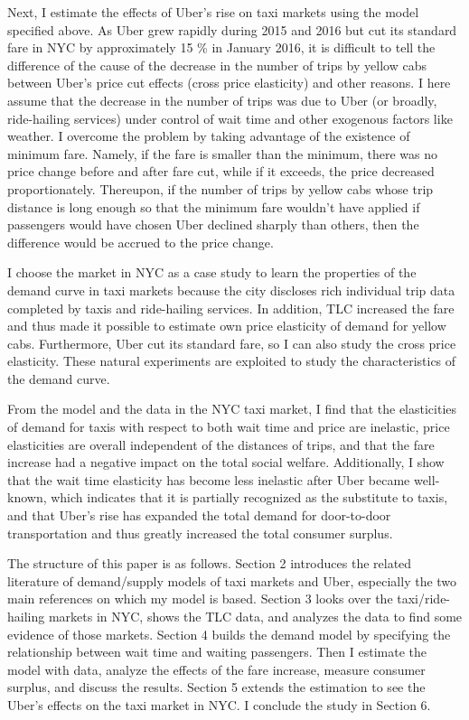 Next, I estimate the effects of Uber's rise on taxi markets using the model specified above. As Uber grew rapidly during 2015 and 2016 but cut its standard fare in NYC by approximately 15 \% in January 2016, it is difficult to tell the difference of the cause of the decrease in the number of trips by yellow cabs between Uber's price cut effects (cross price elasticity) and other reasons. I here assume that the decrease in the number of trips was due to Uber (or broadly, ride-hailing services) under control of wait time and other exogenous factors like weather. I overcome the problem by taking advantage of the existence of minimum fare. Namely, if the fare is smaller than the minimum, there was no price change before and after fare cut, while if it exceeds, the price decreased proportionately. Thereupon, if the number of trips by yellow cabs whose trip distance is long enough so that the minimum fare wouldn't have applied if passengers would have chosen Uber declined sharply than others, then the difference would be accrued to the price change.

I choose the market in NYC as a case study to learn the properties of the demand curve in taxi markets because the city discloses rich individual trip data completed by taxis and ride-hailing services. In addition, TLC increased the fare and thus made it possible to estimate own price elasticity of demand for yellow cabs. Furthermore, Uber cut its standard fare, so I can also study the cross price elasticity. These natural experiments are exploited to study the characteristics of the demand curve.

From the model and the data in the NYC taxi market, I find that the elasticities of demand for taxis with respect to both wait time and price are inelastic, price elasticities are overall independent of the distances of trips, and that the fare increase had a negative impact on the total social welfare. Additionally, I show that the wait time elasticity has become less inelastic after Uber became well-known, which indicates that it is partially recognized as the substitute to taxis, and that Uber's rise has expanded the total demand for door-to-door transportation and thus greatly increased the total consumer surplus.

The structure of this paper is as follows. Section 2 introduces the related literature of demand/supply models of taxi markets and Uber, especially the two main references on which my model is based. Section 3 looks over the taxi/ride-hailing markets in NYC, shows the TLC data, and analyzes the data to find some evidence of those markets. Section 4 builds the demand model by specifying the relationship between wait time and waiting passengers. Then I estimate the model with data, analyze the effects of the fare increase, measure consumer surplus, and discuss the results. Section 5 extends the estimation to see the Uber's effects on the taxi market in NYC. I conclude the study in Section 6.

